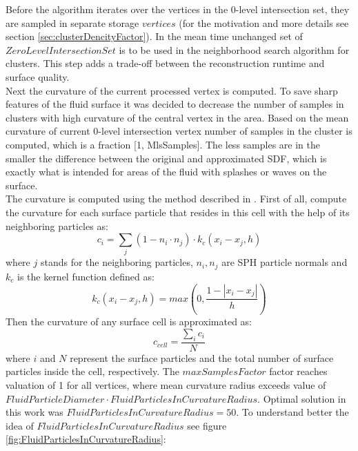 Before the algorithm iterates over the vertices in the 0-level intersection set, they are sampled in separate storage $vertices$ (for the motivation and more details see section \ref{sec:clusterDencityFactor}). In the mean time unchanged set of $ZeroLevelIntersectionSet$ is to be used in the neighborhood search algorithm for clusters. This step adds a trade-off between the reconstruction runtime and surface quality.\\
Next the curvature of the current processed vertex is computed. To save sharp features of the fluid surface it was decided to decrease the number of samples in clusters with high curvature of the central vertex in the area. Based on the mean curvature of current 0-level intersection vertex number of samples in the cluster is computed, which is a fraction [1, MlsSamples]. The less samples are in the smaller the difference between the original and approximated SDF, which is exactly what is intended for areas of the fluid with splashes or waves on the surface.\\
The curvature is computed using the method described in \cite{CurvatureComputation}. First of all, compute the curvature for each surface particle that resides in this cell with the help of its neighboring particles as:
\begin{equation}
	c_i = \sum_j{(1 - n_i \cdot n_j)\cdot k_c(x_i-x_j, h)}
\end{equation}
where $j$ stands for the neighboring particles, $n_i, n_j$ are SPH particle normals and
$k_c$ is the kernel function defined as:
\begin{equation}
	k_c(x_i-x_j, h) = max\left(0, \dfrac{1 - |x_i - x_j|}{h}\right)
\end{equation}
Then the curvature of any surface cell is approximated as:
\begin{equation}
	c_{cell} = \dfrac{\sum_i{c_i}}{N}
\end{equation}
where $i$ and $N$ represent the surface particles and the total number of surface particles inside the cell, respectively. The $maxSamplesFactor$ factor reaches valuation of 1 for all vertices, where mean curvature radius exceeds value of $FluidParticleDiameter \cdot FluidParticlesInCurvatureRadius$. Optimal solution in this work was $FluidParticlesInCurvatureRadius=50$. To understand better the idea of $FluidParticlesInCurvatureRadius$ see figure \ref{fig:FluidParticlesInCurvatureRadius}:
